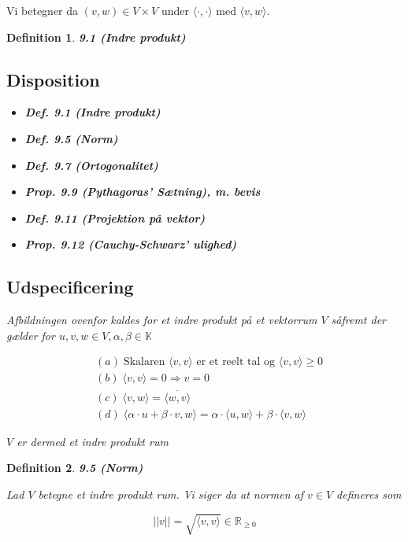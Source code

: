 \documentclass[paper=a4, fontsize=11pt]{scrartcl} %
\newtheorem*{definition}{Definition}
\newenvironment{cstmdefinition}[1]{\begin{definition} {\normalfont\textbf{#1}}}{\end{definition}}
\begin{document}
	Vi betegner da $(v,w) \in V \times V$ under $\langle \cdot , \cdot \rangle$ med $\langle v,w \rangle$.
	
	\begin{cstmdefinition}{9.1 (Indre produkt)}
		
		\subsection{Disposition}
		
		\begin{itemize}
			\item \textbf{Def. 9.1 (Indre produkt)}
			\item \textbf{Def. 9.5 (Norm)}
			\item \textbf{Def. 9.7 (Ortogonalitet)}
			\item \textbf{Prop. 9.9 (Pythagoras' Sætning), m. bevis}
			\item \textbf{Def. 9.11 (Projektion på vektor)}
			\item \textbf{Prop. 9.12 (Cauchy-Schwarz' ulighed)}
		\end{itemize}
		
		\subsection{Udspecificering}
		
		Afbildningen ovenfor kaldes for et indre produkt på et vektorrum $V$ såfremt der gælder for $u,v,w \in V, \alpha,\beta \in \mathbb{K}$
		
		\begin{align*}
			&(a) \; \mbox{Skalaren } \langle v,v \rangle \mbox{ er et reelt tal og } \langle v,v \rangle \geq 0\\
			&(b) \; \langle v,v \rangle = 0 \Rightarrow v = 0\\
			&(c) \; \langle v,w \rangle = \overline{\langle w,v \rangle}\\
			&(d) \; \langle \alpha \cdot u + \beta \cdot v, w \rangle = \alpha \cdot \langle u,w \rangle + \beta \cdot \langle v,w \rangle
		\end{align*}
		
		$V$ er dermed et indre produkt rum
		
	\end{cstmdefinition}
	
	
	\begin{cstmdefinition}{9.5 (Norm)}
		
		
		Lad $V$ betegne et indre produkt rum. Vi siger da at normen af $v \in V$ defineres som
		
		\[||v|| = \sqrt{\langle v,v \rangle} \in \mathbb{R}_{\geq 0}\]
		
	\end{cstmdefinition}
	
\end{document}
